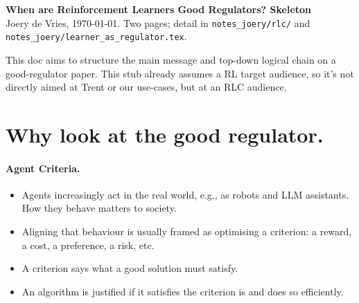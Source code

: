 \documentclass[10pt]{article}
\begin{document}
\begin{center}
{\large\bfseries When are Reinforcement Learners Good Regulators? Skeleton}\\[1mm]
{\small Joery de Vries, \today. Two pages; detail in \texttt{notes\_joery/rlc/} and \texttt{notes\_joery/learner\_as\_regulator.tex}.}
\end{center}

\noindent This doc aims to structure the main message and top-down logical chain on a good-regulator paper.
This stub already assumes a RL target audience, so it's not directly aimed at Trent or our use-cases, but at an RLC audience.

\section{Why look at the good regulator.}

\paragraph{Agent Criteria.}
\begin{itemize}
    \item Agents increasingly act in the real world, e.g., as robots and LLM assistants. How they behave matters to society.
    \item Aligning that behaviour is usually framed as optimising a criterion: a reward, a cost, a preference, a risk, etc.
    \item A criterion says what a good solution must satisfy.
    \item An algorithm is justified if it satisfies the criterion is and does so efficiently.
\end{itemize}

\end{document}
